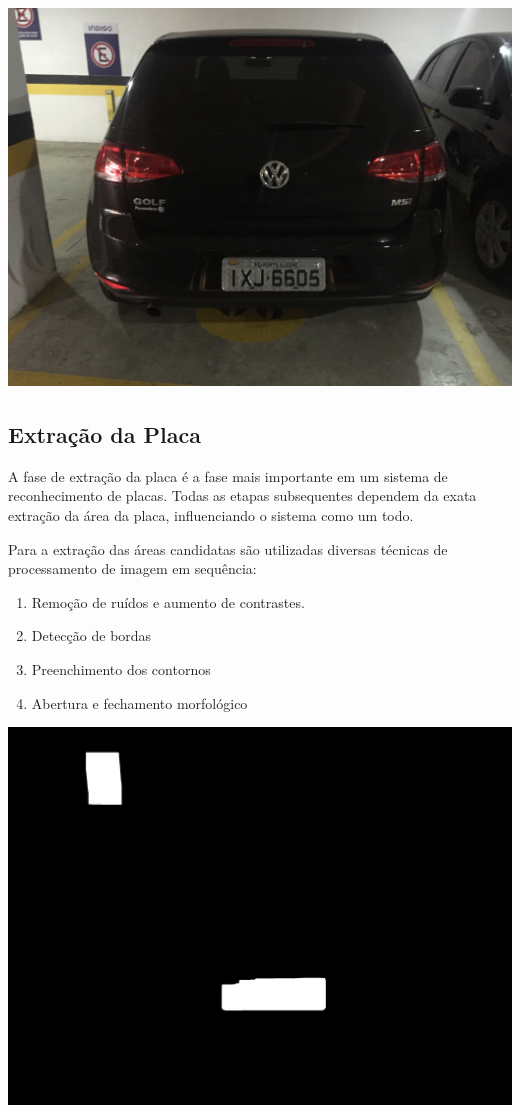 \documentclass[a0,portrait]{a0poster}
\begin{document}
\begin{multicols}{2}
\begin{center}
	\includegraphics[width=0.68\linewidth]{../../input/full_car.JPG}
	\label{fig:input_image}
\end{center}

\color{NavyBlue}
\subsection*{Extração da Placa}
\color{Black}
\Large
\justifying

A fase de extração da placa é a fase mais importante em um sistema de reconhecimento de
placas. Todas as etapas subsequentes dependem da exata extração da área da
placa, influenciando o sistema como um todo.

Para a extração das áreas candidatas são utilizadas diversas técnicas de processamento de
imagem em sequência:

\begin{enumerate}
	\item Remoção de ruídos e aumento de contrastes.
	\item Detecção de bordas
	\item Preenchimento dos contornos
	\item Abertura e fechamento morfológico
\end{enumerate}

\begin{center}
	\includegraphics[width=0.68\linewidth]{9fill_dilated.jpg}
	\label{fig:fill_dilated}
\end{center}


\end{multicols}
\end{document}
